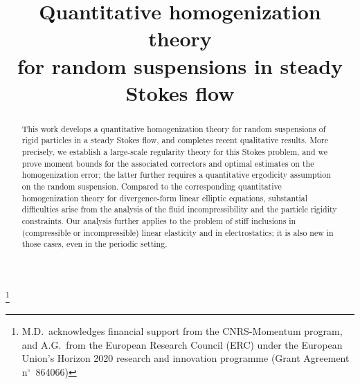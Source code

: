 \documentclass[JEP,XML,SOM,Unicode,published]{cedram}
\newcounter{assumption}
\theoremstyle{plain}
\theoremstyle{definition}
\begin{document}
\frontmatter
\title[Quantitative homogenization of random suspensions]{Quantitative homogenization theory\\for random suspensions in steady Stokes flow}

\author[\initial{M.} \lastname{Duerinckx}]{ }
\address{Université Paris-Saclay, CNRS, Laboratoire de Mathématiques d'Orsay\\
91400~Orsay, France\\
\& University of California, Los Angeles, Department of Mathematics\\
Los Angeles CA 90095, USA\\
\& Université Libre de Bruxelles, Département de Mathématique\\
1050~Brussels, Belgium}
\urladdr{}

\author[\initial{A.} \lastname{Gloria}]{ }
\address{Sorbonne Université, CNRS, Université de Paris, Laboratoire Jacques-Louis Lions\\
75005~Paris, France\\
\& Institut Universitaire de France\\
\& Université Libre de Bruxelles, Département de Mathématique\\
1050~Brussels, Belgium}

\thanks{M.D.\ acknowledges financial support from the CNRS-Momentum program, and A.G.\ from the European Research Council (ERC) under the European Union's Horizon 2020 research and innovation programme (Grant Agreement n$^\circ$~864066)}

\begin{abstract}
This work develops a quantitative homogenization theory for random suspensions of rigid particles in a steady Stokes flow, and completes recent qualitative results. More precisely, we establish a large-scale regularity theory for this Stokes problem, and we prove moment bounds for the associated correctors and optimal estimates on the homogenization error; the latter further requires a quantitative ergodicity assumption on the random suspension. Compared to the corresponding quantitative homogenization theory for divergence-form linear elliptic equations, substantial difficulties arise from the analysis of the fluid incompressibility and the particle rigidity constraints.
Our analysis further applies to the problem of stiff inclusions in (compressible or incompressible) linear elasticity and in electrostatics; it is also new in those cases, even in the periodic setting.
\end{abstract}
\end{document}
